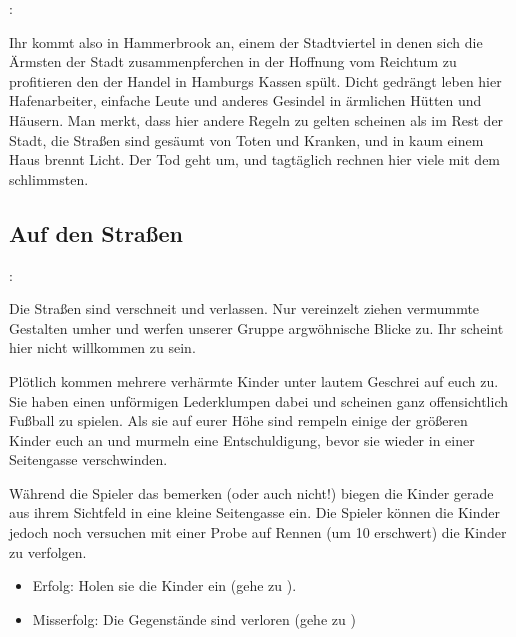 

:

Ihr kommt also in Hammerbrook an, einem der Stadtviertel in denen sich die Ärmsten der Stadt zusammenpferchen in der Hoffnung vom Reichtum zu profitieren den der Handel in Hamburgs Kassen spült. Dicht gedrängt leben hier Hafenarbeiter, einfache Leute und anderes Gesindel in ärmlichen Hütten und Häusern. Man merkt, dass hier andere Regeln zu gelten scheinen als im Rest der Stadt, die Straßen sind gesäumt von Toten und Kranken, und in kaum einem Haus brennt Licht. Der Tod geht um, und tagtäglich rechnen hier viele mit dem schlimmsten.

\subsection{Auf den Straßen}
\label{strasse}

:

Die Straßen sind verschneit und verlassen. Nur vereinzelt ziehen vermummte Gestalten umher und werfen unserer Gruppe argwöhnische Blicke zu. Ihr scheint hier nicht willkommen zu sein.

 \blue{\ref{kampf2}}

Plötlich kommen mehrere verhärmte Kinder unter lautem Geschrei auf euch zu. Sie haben einen unförmigen Lederklumpen dabei und scheinen ganz offensichtlich Fußball zu spielen. Als sie auf eurer Höhe sind rempeln einige der größeren Kinder euch an und murmeln eine Entschuldigung, bevor sie wieder in einer Seitengasse verschwinden.


Während die Spieler das bemerken (oder auch nicht!) biegen die Kinder gerade aus ihrem Sichtfeld in eine kleine Seitengasse ein. Die Spieler können die Kinder jedoch noch versuchen mit einer Probe auf Rennen (um 10 erschwert) die Kinder zu verfolgen.

\begin{itemize}
  \item Erfolg: Holen sie die Kinder ein (gehe zu \blue{\ref{eingeholt}}).
  \item Misserfolg: Die Gegenstände sind verloren (gehe zu \blue{\ref{neingeholt}})
\end{itemize}

